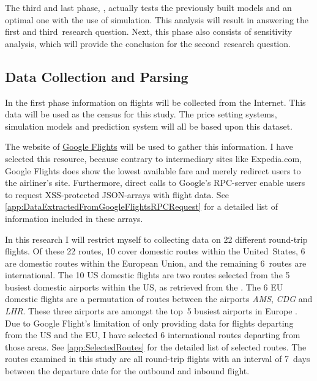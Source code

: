 The third and last phase, , actually tests the previously built models and an optimal one with the use of simulation. This analysis will result in answering the first and third~research question. Next, this phase also consists of sensitivity analysis, which will provide the conclusion for the second~research question.

\subsection{Data Collection and Parsing}
\label{subsec:DataCollectionAndParsing}
In the first phase information on flights will be collected from the Internet. This data will be used as the census for this study. The price setting systems, simulation models and prediction system will all be based upon this dataset.

The website of \href{http://google.nl/flights}{Google Flights} will be used to gather this information. I have selected this resource, because contrary to intermediary sites like Expedia.com, Google Flights does show the lowest available fare and merely redirect users to the airliner's site. Furthermore, direct calls to Google's RPC-server enable users to request XSS-protected JSON-arrays with flight data. See \autoref{app:DataExtractedFromGoogleFlightsRPCRequest} for a detailed list of information included in these arrays.

In this research I will restrict myself to collecting data on 22 different round-trip flights. Of these 22 routes, 10 cover domestic routes within the United~States, 6 are domestic routes within the European Union, and the remaining 6~routes are international. The 10 US domestic flights are two routes selected from the 5 busiest domestic airports within the US, as retrieved from the . The 6 EU domestic flights are a permutation of routes between the airports \emph{AMS}, \emph{CDG} and \emph{LHR}. These three airports are amongst the top~5 busiest airports in Europe . Due to Google Flight's limitation of only providing data for flights departing from the US and the EU, I have selected 6 international routes departing from those areas. See \autoref{app:SelectedRoutes} for the detailed list of selected routes. The routes examined in this study are all round-trip flights with an interval of 7~days between the departure date for the outbound and inbound flight.

